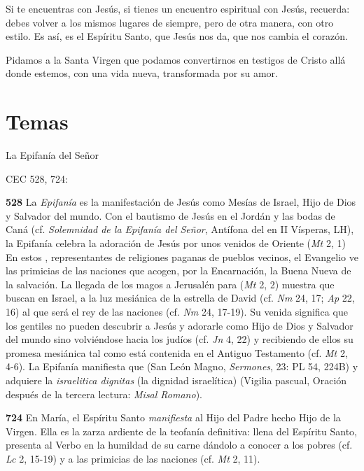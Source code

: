 \begin{body}
\begin{body}
{Si te encuentras con Jesús, si tienes un encuentro espiritual con Jesús, recuerda: debes volver a los mismos lugares de siempre, pero de otra manera, con otro estilo. Es así, es el Espíritu Santo, que Jesús nos da, que nos cambia el corazón.

Pidamos a la Santa Virgen que podamos convertirnos en testigos de Cristo allá donde estemos, con una vida nueva, transformada por su amor.



\section{Temas}

La Epifanía del Señor

CEC 528, 724:

\textbf{528} La \emph{Epifanía} es la manifestación de Jesús como Mesías de Israel, Hijo de Dios y Salvador del mundo. Con el bautismo de Jesús en el Jordán y las bodas de Caná (cf. \emph{Solemnidad de la Epifanía del Señor}, Antífona del  en II Vísperas, LH), la Epifanía celebra la adoración de Jesús por unos  venidos de Oriente (\emph{Mt} 2, 1) En estos , representantes de religiones paganas de pueblos vecinos, el Evangelio ve las primicias de las naciones que acogen, por la Encarnación, la Buena Nueva de la salvación. La llegada de los magos a Jerusalén para  (\emph{Mt} 2, 2) muestra que buscan en Israel, a la luz mesiánica de la estrella de David (cf. \emph{Nm} 24, 17; \emph{Ap} 22, 16) al que será el rey de las naciones (cf. \emph{Nm} 24, 17-19). Su venida significa que los gentiles no pueden descubrir a Jesús y adorarle como Hijo de Dios y Salvador del mundo sino volviéndose hacia los judíos (cf. \emph{Jn} 4, 22) y recibiendo de ellos su promesa mesiánica tal como está contenida en el Antiguo Testamento (cf. \emph{Mt} 2, 4-6). La Epifanía manifiesta que  (San León Magno, \emph{Sermones}, 23: PL 54, 224B) y adquiere la \emph{israelitica dignitas} (la dignidad israelítica) (Vigilia pascual, Oración después de la tercera lectura: \emph{Misal Romano}).

\textbf{724} En María, el Espíritu Santo \emph{manifiesta} al Hijo del Padre hecho Hijo de la Virgen. Ella es la zarza ardiente de la teofanía definitiva: llena del Espíritu Santo, presenta al Verbo en la humildad de su carne dándolo a conocer a los pobres (cf. \emph{Lc} 2, 15-19) y a las primicias de las naciones (cf. \emph{Mt} 2, 11).

}
\end{body}
\end{body}
